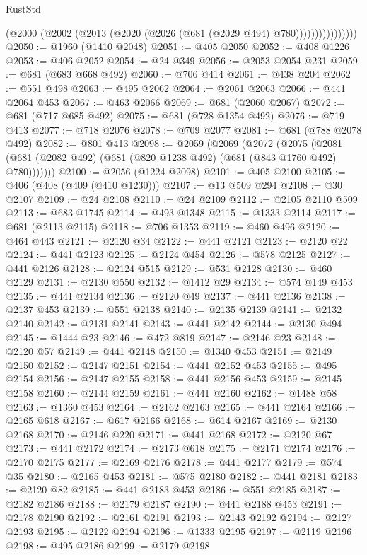 \begin{lexlean}{RustStd}
\begin{coremodule}
                        (@2000 (@2002 (@2013 (@2020 (@2026 (@681 (@2029 @494) @780))))))))))))))))
@2050 := @1960 (@1410 @2048)
@2051 := @405 @2050
@2052 := @408 @1226
@2053 := @406 @2052
@2054 := @24 @349
@2056 := @2053 @2054 @231
@2059 := @681 (@683 @668 @492)
@2060 := @706 @414
@2061 := @438 @204
@2062 := @551 @498
@2063 := @495 @2062
@2064 := @2061 @2063
@2066 := @441 @2064 @453
@2067 := @463 @2066
@2069 := @681 (@2060 @2067)
@2072 := @681 (@717 @685 @492)
@2075 := @681 (@728 @1354 @492)
@2076 := @719 @413
@2077 := @718 @2076
@2078 := @709 @2077
@2081 := @681 (@788 @2078 @492)
@2082 := @801 @413
@2098 := @2059
    (@2069
      (@2072
        (@2075 (@2081 (@681 (@2082 @492) (@681 (@820 @1238 @492) (@681 (@843 @1760 @492) @780)))))))
@2100 := @2056 (@1224 @2098)
@2101 := @405 @2100
@2105 := @406 (@408 (@409 (@410 @1230)))
@2107 := @13 @509 @294
@2108 := @30 @2107
@2109 := @24 @2108
@2110 := @24 @2109
@2112 := @2105 @2110 @509
@2113 := @683 @1745
@2114 := @493 @1348
@2115 := @1333 @2114
@2117 := @681 (@2113 @2115)
@2118 := @706 @1353
@2119 := @460 @496
@2120 := @464 @443
@2121 := @2120 @34
@2122 := @441 @2121
@2123 := @2120 @22
@2124 := @441 @2123
@2125 := @2124 @454
@2126 := @578 @2125
@2127 := @441 @2126
@2128 := @2124 @515
@2129 := @531 @2128
@2130 := @460 @2129
@2131 := @2130 @550
@2132 := @1412 @29
@2134 := @574 @149 @453
@2135 := @441 @2134
@2136 := @2120 @49
@2137 := @441 @2136
@2138 := @2137 @453
@2139 := @551 @2138
@2140 := @2135 @2139
@2141 := @2132 @2140
@2142 := @2131 @2141
@2143 := @441 @2142
@2144 := @2130 @494
@2145 := @1444 @23
@2146 := @472 @819
@2147 := @2146 @23
@2148 := @2120 @57
@2149 := @441 @2148
@2150 := @1340 @453
@2151 := @2149 @2150
@2152 := @2147 @2151
@2154 := @441 @2152 @453
@2155 := @495 @2154
@2156 := @2147 @2155
@2158 := @441 @2156 @453
@2159 := @2145 @2158
@2160 := @2144 @2159
@2161 := @441 @2160
@2162 := @1488 @58
@2163 := @1360 @453
@2164 := @2162 @2163
@2165 := @441 @2164
@2166 := @2165 @618
@2167 := @617 @2166
@2168 := @614 @2167
@2169 := @2130 @2168
@2170 := @2146 @220
@2171 := @441 @2168
@2172 := @2120 @67
@2173 := @441 @2172
@2174 := @2173 @618
@2175 := @2171 @2174
@2176 := @2170 @2175
@2177 := @2169 @2176
@2178 := @441 @2177
@2179 := @574 @35
@2180 := @2165 @453
@2181 := @575 @2180
@2182 := @441 @2181
@2183 := @2120 @82
@2185 := @441 @2183 @453
@2186 := @551 @2185
@2187 := @2182 @2186
@2188 := @2179 @2187
@2190 := @441 @2188 @453
@2191 := @2178 @2190
@2192 := @2161 @2191
@2193 := @2143 @2192
@2194 := @2127 @2193
@2195 := @2122 @2194
@2196 := @1333 @2195
@2197 := @2119 @2196
@2198 := @495 @2186
@2199 := @2179 @2198

\end{coremodule}
\end{lexlean}
